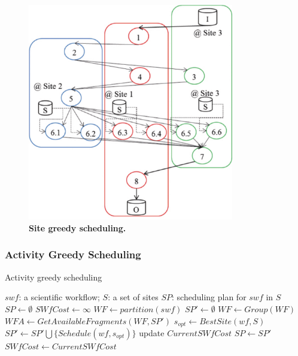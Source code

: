 \begin{figure}
\begin{centering}
\captionsetup{justification=centering}
\includegraphics[width=90mm]{figures/FIG4}
\par\end{centering}
\caption{\textbf{Site greedy scheduling.}}
\label{fig:SGreedy}
\end{figure}

\subsubsection{Activity Greedy Scheduling}

\begin{algorithm}[ht]
\caption{Activity greedy scheduling}\label{alg:ActGreedy}
\begin{algorithmic}[1]
\INPUT $swf$: a scientific workflow; $S$: a set of sites
\OUTPUT $SP$: scheduling plan for $swf$ in $S$
\State $SP\gets \emptyset$
\State $SWfCost \gets \infty$
\State $WF\gets partition( swf )$ 
\Do
\State $SP' \gets \emptyset$
\State $WF\gets Group(WF)$ 
\Do
\State $WFA \gets GetAvailableFragments(WF, SP')$
\State $s_{opt} \gets BestSite( wf, S )$ 
\State $SP' \gets SP' \bigcup \{Schedule( wf, s_{opt} )\}$
\State update $CurrentSWfCost$
\EndFor
\EndIf
{}
\State $SP \gets SP'$
\State $SWfCost \gets CurrentSWfCost$
\EndIf
{}
\ENDBEGIN
\end{algorithmic}
\end{algorithm}

